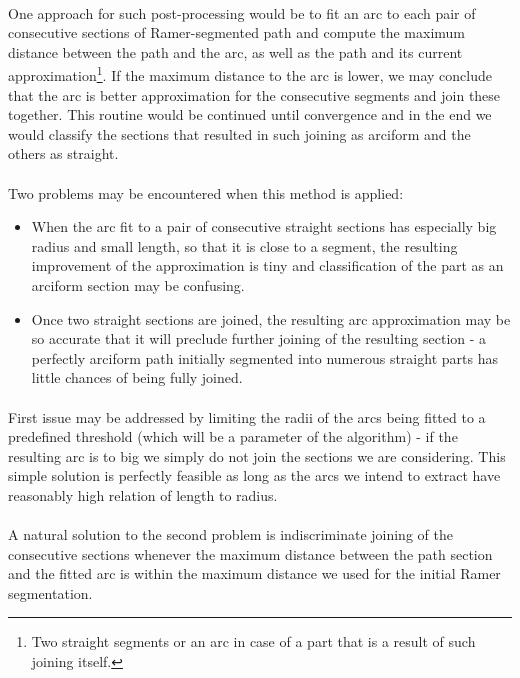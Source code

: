 \paragraph*{}
One approach for such post-processing would be to fit an arc to each pair of consecutive sections of Ramer-segmented path and compute the maximum distance between the path and the arc, as well as the path and its current approximation\footnote{Two straight segments or an arc in case of a part that is a result of such joining itself.}. If the maximum distance to the arc is lower, we may conclude that the arc is better approximation for the consecutive segments and join these together. This routine would be continued until convergence and in the end we would classify the sections that resulted in such joining as arciform and the others as straight.

\paragraph*{}
Two problems may be encountered when this method is applied:

\begin{itemize}
	\item When the arc fit to a pair of consecutive straight sections has especially big radius and small length, so that it is close to a segment, the resulting improvement of the approximation is tiny and classification of the part as an arciform section may be confusing.
	\item Once two straight sections are joined, the resulting arc approximation may be so accurate that it will preclude further joining of the resulting section - a perfectly arciform path initially segmented into numerous straight parts has little chances of being fully joined.
\end{itemize}

\paragraph*{}
First issue may be addressed by limiting the radii of the arcs being fitted to a predefined threshold (which will be a parameter of the algorithm) - if the resulting arc is to big we simply do not join the sections we are considering. This simple solution is perfectly feasible as long as the arcs we intend to extract have reasonably high relation of length to radius.

\paragraph*{}
A natural solution to the second problem is indiscriminate joining of the consecutive sections whenever the maximum distance between the path section and the fitted arc is within the maximum distance we used for the initial Ramer segmentation.

